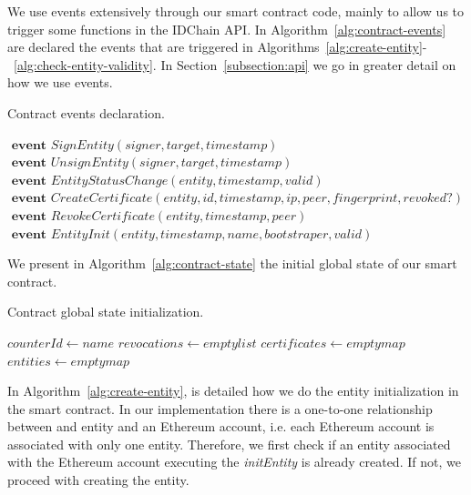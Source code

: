 We use events extensively through our smart contract code, mainly to allow us to trigger some functions in the IDChain API.
In Algorithm~\ref{alg:contract-events} are declared the events that are triggered in Algorithms~\ref{alg:create-entity}-~\ref{alg:check-entity-validity}.
In Section~\ref{subsection:api} we go in greater detail on how we use events.

\begin{algorithm}[h!]
  \caption{Contract events declaration.}
  \label{alg:contract-events}
  \begin{algorithmic}
    \State $\textbf{ event } SignEntity(signer, target, timestamp)$
    \State $\textbf{ event } UnsignEntity(signer, target, timestamp)$
    \State $\textbf{ event } EntityStatusChange(entity, timestamp, valid)$
    \State $\textbf{ event } CreateCertificate(entity, id, timestamp, ip, peer, fingerprint, revoked?)$
    \State $\textbf{ event } RevokeCertificate(entity, timestamp, peer)$
    \State $\textbf{ event } EntityInit(entity, timestamp, name, bootstraper, valid)$
  \end{algorithmic}
\end{algorithm}

We present in Algorithm~\ref{alg:contract-state} the initial global state of our smart contract.

\begin{algorithm}[h!]
  \caption{Contract global state initialization.}
  \label{alg:contract-state}
  \begin{algorithmic}
    \State $counterId \gets name$ 
    \State $revocations \gets empty list$ 
    \State $certificates \gets empty map$ 
    \State $entities \gets empty map$ 
  \end{algorithmic}
\end{algorithm}

In Algorithm~\ref{alg:create-entity}, is detailed how we do the entity initialization in the smart contract.
In our implementation there is a one-to-one relationship between and entity and an Ethereum account, i.e. each Ethereum account is associated with only one entity.
Therefore, we first check if an entity associated with the Ethereum account executing the \textit{initEntity} is already created.
If not, we proceed with creating the entity.


